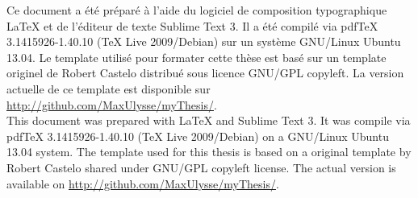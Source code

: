 \singlespacing

	\begin{center}
		\begin{tcolorbox}[colback=black!5!white,colframe=white!15!black,arc=0mm]
			\sffamily
			Ce document a été préparé à l'aide du logiciel de composition typographique {\LaTeX} et de l'éditeur de texte Sublime Text 3. Il a été compilé via pdfTeX 3.1415926-1.40.10 (TeX Live 2009/Debian) sur un système GNU/Linux Ubuntu 13.04. Le template utilisé pour formater cette thèse est basé sur un template originel de Robert Castelo distribué sous licence GNU/GPL copyleft. La version actuelle de ce template est disponible sur \url{http://github.com/MaxUlysse/myThesis/}.\\
			This document was prepared with {\LaTeX} and Sublime Text 3. It was compile via pdfTeX 3.1415926-1.40.10 (TeX Live 2009/Debian) on a GNU/Linux Ubuntu 13.04 system.
			The template used for this thesis is based on a original template by Robert Castelo shared under GNU/GPL copyleft license. The actual version is available on \url{http://github.com/MaxUlysse/myThesis/}.
		\end{tcolorbox}
	\end{center}
